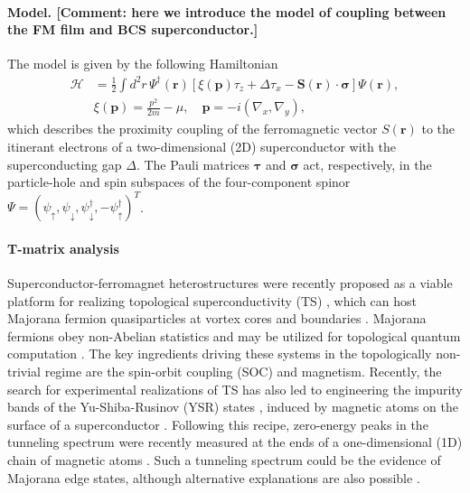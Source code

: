 \documentclass[twocolumn,showpacs,floatfix,nofootinbib,longbibliography]{revtex4-1}
\begin{document}
\paragraph*{Model. [Comment: here we introduce the model of coupling between the FM film and BCS superconductor.]} \label{sec:model}
The model is given by the following Hamiltonian 
\begin{align}
	\mathcal H &= \frac{1}{2}\int d^2r\, \Psi^\dagger(\bm r)\left[\xi(\bm p)\tau_z+\Delta \tau_x - \bm S(\bm r)\cdot\bm\sigma\right]\Psi(\bm r), \label{ham} \\
  & \xi(\bm p) = \frac{p^2}{2m}-\mu,\quad \bm p = -i(\nabla_x,\nabla_y),
\end{align}
which describes the proximity coupling of the ferromagnetic vector $S(\bm r)$ to the itinerant electrons of a two-dimensional (2D) superconductor with the superconducting gap $\Delta$. The Pauli matrices $\bm \tau$ and $\bm \sigma$ act, respectively, in the particle-hole and spin subspaces of the four-component spinor $\Psi = (\psi_\uparrow,\psi_\downarrow,\psi^\dagger_\downarrow,-\psi^\dagger_\uparrow)^T$.
\paragraph*{T-matrix analysis} \label{sec:analytics}
Superconductor-ferromagnet heterostructures were recently proposed as a viable platform for realizing topological superconductivity (TS) \cite{Lutchyn2010,Oreg2010, Sau2010}, which can host Majorana fermion quasiparticles at vortex cores and boundaries \cite{Kitaev2001, Alicea, Beenakker2013}. Majorana fermions obey non-Abelian statistics and may be utilized for topological quantum computation \cite{Read2000, Ivanov2001, Nayak2008}.  The key ingredients driving these systems in the topologically non-trivial regime are the spin-orbit coupling (SOC) and magnetism. Recently, the search for experimental realizations of TS has also led to engineering the impurity bands of the Yu-Shiba-Rusinov (YSR) states \cite{Yu,Shiba,Rusinov}, induced by magnetic atoms on the surface of a superconductor \cite{Choy2011, Nadj-Perge2013, Klinovaja2013, Vazifeh2013, Braunecker2013, Pientka2013, Nakosai2013, Poyhonen2014, Reis2014, Brydon2015, Rontynen2014, Li2015}. Following this recipe, zero-energy peaks in the tunneling spectrum were recently measured at the ends of a one-dimensional (1D) chain of magnetic atoms \cite{Yazdani2014}. Such a tunneling spectrum could be the evidence of Majorana edge states, although alternative explanations are also possible \cite{Sau2015}.
\end{document}
